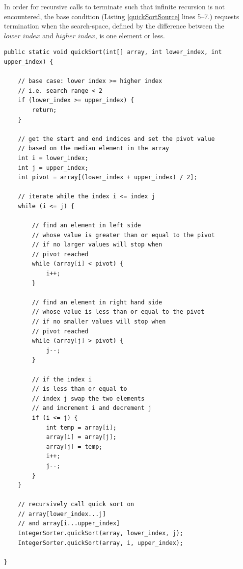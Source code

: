 \documentclass[12pt,a4paper]{article}
\begin{document}
In order for recursive calls to terminate such that infinite recursion is not encountered, the base condition (Listing \ref{quickSortSource} lines 5--7.) requests termination when the search-space, defined by the difference between the $lower\_index$ and $higher\_index$, is one element or less.

\clearpage


\begin{lstlisting}[caption={QuickSort algorithm \cite{quickSort1, quickSort2, quickSort3} implemented in the current project.},captionpos=b, label={quickSortSource}]
public static void quickSort(int[] array, int lower_index, int upper_index) {

	// base case: lower index >= higher index 
	// i.e. search range < 2
	if (lower_index >= upper_index) {
		return;
	}

	// get the start and end indices and set the pivot value
	// based on the median element in the array
	int i = lower_index;
	int j = upper_index;
	int pivot = array[(lower_index + upper_index) / 2];

	// iterate while the index i <= index j
	while (i <= j) {
		
		// find an element in left side 
		// whose value is greater than or equal to the pivot
		// if no larger values will stop when
		// pivot reached
		while (array[i] < pivot) {
			i++;
		}
		
		// find an element in right hand side 
		// whose value is less than or equal to the pivot
		// if no smaller values will stop when
		// pivot reached
		while (array[j] > pivot) {
			j--;
		}

		// if the index i
		// is less than or equal to
		// index j swap the two elements
		// and increment i and decrement j
		if (i <= j) {
			int temp = array[i];
			array[i] = array[j];
			array[j] = temp;
			i++;
			j--;
		}
	}

	// recursively call quick sort on 
	// array[lower_index...j]
	// and array[i...upper_index]
	IntegerSorter.quickSort(array, lower_index, j);
	IntegerSorter.quickSort(array, i, upper_index);

}
\end{lstlisting}
\end{document}
